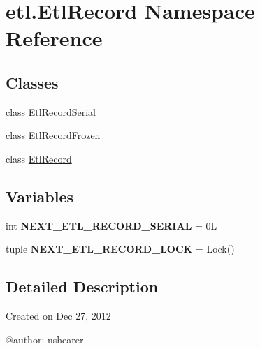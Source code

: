 \hypertarget{namespaceetl_1_1EtlRecord}{\section{etl.\-Etl\-Record Namespace Reference}
\label{namespaceetl_1_1EtlRecord}
}
\subsection*{Classes}
\begin{DoxyCompactItemize}
\item 
class \hyperlink{classetl_1_1EtlRecord_1_1EtlRecordSerial}{Etl\-Record\-Serial}
\item 
class \hyperlink{classetl_1_1EtlRecord_1_1EtlRecordFrozen}{Etl\-Record\-Frozen}
\item 
class \hyperlink{classetl_1_1EtlRecord_1_1EtlRecord}{Etl\-Record}
\end{DoxyCompactItemize}
\subsection*{Variables}
\begin{DoxyCompactItemize}
\item 
\hypertarget{namespaceetl_1_1EtlRecord_a90e10445f0b4332a137ed2716c3d6e00}{int {\bfseries N\-E\-X\-T\-\_\-\-E\-T\-L\-\_\-\-R\-E\-C\-O\-R\-D\-\_\-\-S\-E\-R\-I\-A\-L} = 0\-L}\label{namespaceetl_1_1EtlRecord_a90e10445f0b4332a137ed2716c3d6e00}

\item 
\hypertarget{namespaceetl_1_1EtlRecord_adb345323a14bb22653450d7496e1961d}{tuple {\bfseries N\-E\-X\-T\-\_\-\-E\-T\-L\-\_\-\-R\-E\-C\-O\-R\-D\-\_\-\-L\-O\-C\-K} = Lock()}\label{namespaceetl_1_1EtlRecord_adb345323a14bb22653450d7496e1961d}

\end{DoxyCompactItemize}


\subsection{Detailed Description}
\begin{DoxyVerb}Created on Dec 27, 2012

@author: nshearer
\end{DoxyVerb}
 